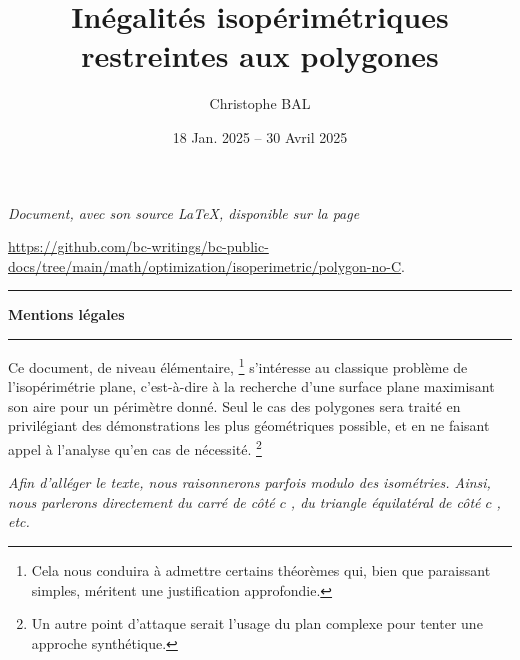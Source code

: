 \documentclass[12pt]{amsart}
\begin{document}
\title{Inégalités isopérimétriques restreintes aux polygones}
\author{Christophe BAL}
\date{18 Jan. 2025 -- 30 Avril 2025}

\maketitle

\begin{center}
    \itshape
    Document, avec son source \LaTeX, disponible sur la page

    \url{https://github.com/bc-writings/bc-public-docs/tree/main/math/optimization/isoperimetric/polygon-no-C}.
\end{center}


\bigskip


\begin{center}
    \hrule\vspace{.3em}
    {
        \fontsize{1.35em}{1em}\selectfont
        \textbf{Mentions \og légales \fg}
    }

    \vspace{0.45em}
    \doclicenseThis
    \hrule
\end{center}



\setcounter{tocdepth}{2}
\tableofcontents




\newpage

\begin{meta-abstract*}
    Ce document, de niveau élémentaire,%
    \footnote{
        Cela nous conduira à admettre certains théorèmes qui, bien que paraissant simples, méritent une justification approfondie.
    }
    s'intéresse au classique problème de l'isopérimétrie plane, c'est-à-dire à la recherche d'une surface plane maximisant son aire pour un périmètre donné.
    Seul le cas des polygones sera traité en privilégiant des démonstrations les plus géométriques possible, et en ne faisant appel à l'analyse qu'en cas de nécessité.%
    \footnote{
        Un autre point d'attaque serait l'usage du plan complexe pour tenter une approche synthétique.
    }
\end{meta-abstract*}


\begin{tcolorbox}
    \itshape\small
    Afin d'alléger le texte, nous raisonnerons parfois modulo des isométries. Ainsi, nous parlerons directement du \og carré de côté \( c \) \fg, du \og triangle équilatéral de côté \( c \) \fg, etc.
\end{tcolorbox}
\end{document}
